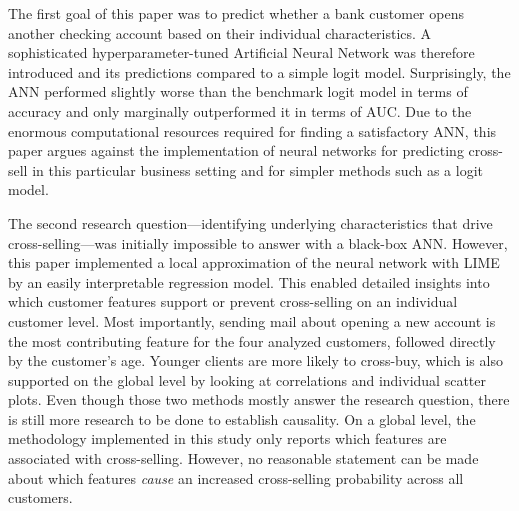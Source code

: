 \documentclass[12pt,a4paper]{article}
\begin{document}
The first goal of this paper was to predict whether a bank customer opens another checking account based on their individual characteristics.
A sophisticated hyper\-parameter\--tuned Artificial Neural Network was therefore introduced and its predictions compared to a simple logit model.
Surprisingly, the ANN performed slightly worse than the benchmark logit model in terms of accuracy and only marginally outperformed it in terms of AUC.
Due to the enormous computational resources required for finding a satisfactory ANN, this paper argues against the implementation of neural networks
for predicting cross-sell in this particular business setting and for simpler methods such as a logit model.

The second research question---identifying underlying characteristics that drive cross-selling---was initially impossible to answer with a black-box ANN.
However, this paper implemented a local approximation of the neural network with LIME by an easily interpretable regression model.
This enabled detailed insights into which customer features support or prevent cross-selling on an individual customer level.
Most importantly, sending mail about opening a new account is the most contributing feature for the four analyzed customers, followed directly by the customer's age.
Younger clients are more likely to cross-buy, which is also supported on the global level by looking at correlations and individual scatter plots.
Even though those two methods mostly answer the research question, there is still more research to be done to establish causality.
On a global level, the methodology implemented in this study only reports which features are associated with cross-selling.
However, no reasonable statement can be made about which features \textit{cause} an increased cross-selling probability across all customers.




\clearpage
\appendix
\end{document}

